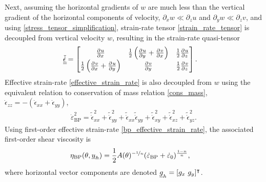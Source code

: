 Next, assuming the horizontal gradients of $w$ are much less than the vertical gradient of the horizontal components of velocity, \ie $\partial_x w \ll \partial_z u$ and $\partial_y w \ll \partial_z v$, and using \cref{stress_tensor_simplification}, strain-rate tensor \cref{strain_rate_tensor} is decoupled from vertical velocity $w$, resulting in the strain-rate quasi-tensor
\begin{align}
  \label{bp_strain_rate_tensor}
  \tilde{\underline{\underline{\dot{\epsilon}}}}
  &= \begin{bmatrix}
       \frac{\partial{^{}} u}{\partial x{^{}} } & \frac{1}{2}\left( \frac{\partial{^{}} u}{\partial y{^{}} } + \frac{\partial{^{}} v}{\partial x{^{}} } \right) & \frac{1}{2} \frac{\partial{^{}} u}{\partial z{^{}} } \\
       \frac{1}{2}\left( \frac{\partial{^{}} v}{\partial x{^{}} } + \frac{\partial{^{}} u}{\partial y{^{}} } \right) & \frac{\partial{^{}} v}{\partial y{^{}} } & \frac{1}{2} \frac{\partial{^{}} v}{\partial z{^{}} } \\
     \end{bmatrix}.
\end{align}
Effective strain-rate \cref{effective_strain_rate} is also decoupled from $w$ using the equivalent relation to conservation of mass relation \cref{cons_mass}, $\dot{\epsilon}_{zz} = -\left(\dot{\epsilon}_{xx} + \dot{\epsilon}_{yy} \right)$,
\begin{align}
  \label{bp_effective_strain_rate}
  \dot{\varepsilon}_{\text{BP}}^2 = \tilde{\dot{\epsilon}}_{xx}^2 + \tilde{\dot{\epsilon}}_{yy}^2 + \tilde{\dot{\epsilon}}_{xx} \tilde{\dot{\epsilon}}_{yy} + \tilde{\dot{\epsilon}}_{xy}^2 + \tilde{\dot{\epsilon}}_{xz}^2 + \tilde{\dot{\epsilon}}_{yz}^2.
\end{align}
Using first-order effective strain-rate \cref{bp_effective_strain_rate}, the associated first-order shear viscosity is
\begin{align}
  \label{bp_viscosity}
  \eta_{\text{BP}}(\theta, \underline{u}_h) &= \frac{1}{2}A(\theta)^{-\nicefrac{1}{n}} (\dot{\varepsilon}_{\text{BP}} + \dot{\varepsilon}_0)^{\frac{1-n}{n}},
\end{align} 
where horizontal vector components are denoted $\rankone{g}_h = [g_x\ g_y]^\intercal$.


